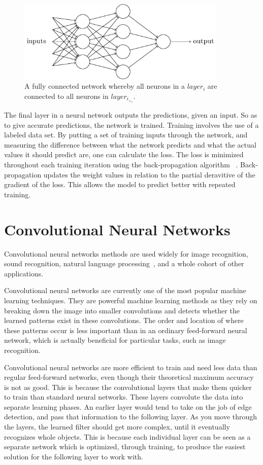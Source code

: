 \documentclass[12pt,a4paper,oneside,oldfontcommands]{memoir}
\begin{document}
    \begin{figure}[ht]
    \center
      \includegraphics[width=10cm]{images/fully_connected.png}
      \caption{A fully connected network whereby all neurons in a \(layer_i\) are connected to all neurons in \(layer_i_+_1\).}
      \label{fig:fully_connected}
    \end{figure}
    
The final layer in a neural network outputs the predictions, given an input. So as to give accurate predictions, the network is trained. Training involves the use of a labeled data set. By putting a set of training inputs through the network, and measuring the difference between what the network predicts and what the actual values it should predict are, one can calculate the loss. The loss is minimized throughout each training iteration using the back-propagation algorithm ~\cite{rumelhart}. Back-propagation updates the weight values in relation to the partial deravitive of the gradient of the loss. This allows the model to predict better with repeated training. 

\section{Convolutional Neural Networks}

Convolutional neural networks methods are used widely for image recognition, sound recognition, natural language processing~\cite{Bhandare}, and a whole cohort of other applications.

Convolutional neural networks are currently one of the most popular machine learning techniques. They are powerful machine learning methods as they rely on breaking down the image into smaller convolutions and detects whether the learned patterns exist in these convolutions. The order and location of where these patterns occur is less important than in an ordinary feed-forward neural network, which is actually beneficial for particular tasks, such as image recognition.

Convolutional neural networks are more efficient to train and need less data than regular feed-forward networks, even though their theoretical maximum accuracy is not as good. This is because the convolutional layers that make them quicker to train than standard neural networks. These layers convolute the data into separate learning phases. An earlier layer would tend to take on the job of edge detection, and pass that information to the following layer. As you move through the layers, the learned filter should get more complex, until it eventually recognizes whole objects. This is because each individual layer can be seen as a separate network which is optimized, through training, to produce the easiest solution for the following layer to work with. 
\end{document}
